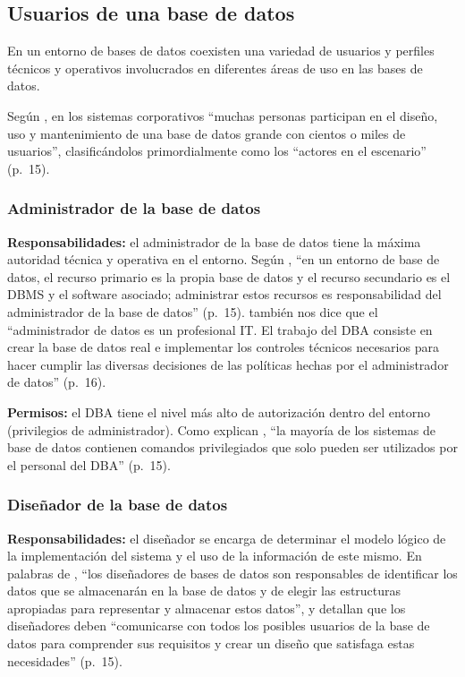 \subsection{Usuarios de una base de datos}

En un entorno de bases de datos coexisten una variedad de usuarios y perfiles técnicos y operativos involucrados en diferentes áreas de uso en las bases de datos.

Según \textcite{elmasri_navathe}, en los sistemas corporativos \enquote{muchas personas participan en el diseño, uso y mantenimiento de una base de datos grande con cientos o miles de usuarios}, clasificándolos primordialmente como los \enquote{actores en el escenario} (p.~15).

\subsubsection{Administrador de la base de datos}

\textbf{Responsabilidades:} el administrador de la base de datos tiene la máxima autoridad técnica y operativa en el entorno. Según \textcite{elmasri_navathe}, \enquote{en un entorno de base de datos, el recurso primario es la propia base de datos y el recurso secundario es el DBMS y el software asociado; administrar estos recursos es responsabilidad del administrador de la base de datos} (p.~15). \textcite{date_intro_bd} también nos dice que el \enquote{administrador de datos es un profesional IT. El trabajo del DBA consiste en crear la base de datos real e implementar los controles técnicos necesarios para hacer cumplir las diversas decisiones de las políticas hechas por el administrador de datos} (p.~16).

\textbf{Permisos:} el DBA tiene el nivel más alto de autorización dentro del entorno (privilegios de administrador). Como explican \textcite{elmasri_navathe}, \enquote{la mayoría de los sistemas de base de datos contienen comandos privilegiados que solo pueden ser utilizados por el personal del DBA} (p.~15).

\subsubsection{Diseñador de la base de datos}

\textbf{Responsabilidades:} el diseñador se encarga de determinar el modelo lógico de la implementación del sistema y el uso de la información de este mismo. En palabras de \textcite{elmasri_navathe}, \enquote{los diseñadores de bases de datos son responsables de identificar los datos que se almacenarán en la base de datos y de elegir las estructuras apropiadas para representar y almacenar estos datos}, y detallan que los diseñadores deben \enquote{comunicarse con todos los posibles usuarios de la base de datos para comprender sus requisitos y crear un diseño que satisfaga estas necesidades} (p.~15).

